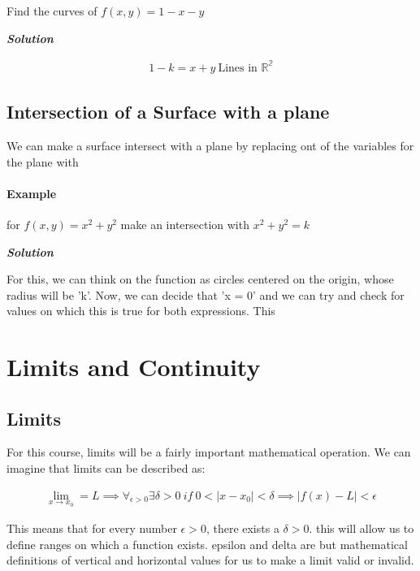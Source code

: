 \documentclass[11pt,fleqn]{book} %
\begin{document}
Find the curves of $ f(x,y) = 1-x-y $

\textit{\textbf{Solution}}

\begin{gather}
    1 - k = x+y \ \text{Lines in $\mathbb{R^2}$}
\end{gather}

\subsection*{Intersection of a Surface with a plane}

We can make a surface intersect with a plane by replacing ont of the variables for the plane with 

\paragraph*{Example}

for $f(x,y) = x^2 + y^2$ make an intersection with $x^2 + y^2 = k $ 

\textit{\textbf{Solution}}

For this, we can think on the function as circles centered on the origin, whose radius will be 'k'.
Now, we can decide that 'x = 0' and we can try and check for values on which this is true for both expressions. This

\section{Limits and Continuity}

\subsection{Limits}

For this course, limits will be a fairly important mathematical operation. We
can imagine that limits can be described as:

\begin{gather}
    \lim_{x \to x_0} = L \implies \forall_{\epsilon > 0} \exists \delta > 0 \ if \ 0 < |x-x_0| < \delta \implies |f(x) - L| < \epsilon
\end{gather}

This means that for every number $\epsilon > 0$, there exists a $\delta >0$.
this will allow us to define ranges on which a function exists. epsilon and delta are but 
mathematical definitions of vertical and horizontal values for us to make a limit valid or invalid.
\end{document}
